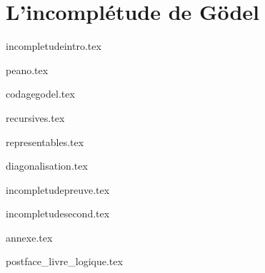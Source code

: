 \documentclass[11pt]{report}
\begin{document}
\part{L'incomplétude de Gödel}

{incompletudeintro.tex}

{peano.tex}

{codagegodel.tex}

{recursives.tex}

{representables.tex}

{diagonalisation.tex}

{incompletudepreuve.tex}

{incompletudesecond.tex}

	

{annexe.tex}

{postface_livre_logique.tex}

\vfill


\bigskip
\bigskip
\end{document}
